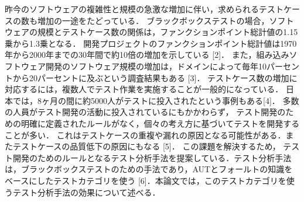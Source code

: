 \documentclass[a4paper,11pt]{jreport}
\begin{document}
昨今のソフトウェアの複雑性と規模の急激な増加に伴い，求められるテストケースの数も増加の一途をたどっている．
ブラックボックステストの場合，ソフトウェアの規模とテストケース数の関係は，ファンクションポイント総計値の1.15乗から1.3乗となる．
開発プロジェクトのファンクションポイント総計値は1970年から2000年までの30年間で約10倍の増加を示している [2]．
また，組み込みソフトウェア開発のソフトウェア規模の増加は，ドメインによって毎年10パーセントから20パーセントに及ぶという調査結果もある [3]．
テストケース数の増加に対応するには，複数人でテスト作業を実施することが一般的になっている．
日本では，8ヶ月の間に約5000人がテストに投入されたという事例もある[4]．
多数の人員がテスト開発の活動に投入されているにもかかわらず， テスト開発のための明確に定義されたルールがなく，個々の考え方に基づいてテストを開発することが多い．
これはテストケースの重複や漏れの原因となる可能性がある．またテストケースの品質低下の原因にもなる [5]．
 この課題を解決するため， テスト開発のためのルールとなるテスト分析手法を提案している．テスト分析手法は，ブラックボックステストのための手法であり，AUTとフォールトの知識をベースにしたテストカテゴリを使う [6]．本論文では，このテストカテゴリを使うテスト分析手法の効果について述べる．
\end{document}
